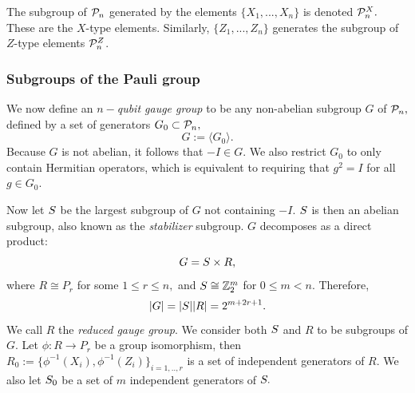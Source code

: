 The subgroup of $\mathcal{P}_n$ generated by
the elements $\{X_1,...,X_n\}$ %
is denoted $\mathcal{P}_n^X.$ These are the $X$-type
elements. Similarly,
 $\{Z_1,...,Z_n\}$ generates %
the subgroup of $Z$-type elements $\mathcal{P}_n^Z$.

\subsubsection{Subgroups of the Pauli group}

We now define an {\it $n-$qubit gauge group} to be 
any non-abelian subgroup $G$ of $\mathcal{P}_n,$
defined by a set of generators $G_0\subset \mathcal{P}_n,$
$$ G := \langle G_0\rangle.$$
Because $G$ is not abelian, it follows that $-I\in G.$
We also restrict $G_0$ to only contain Hermitian operators,
which is equivalent to requiring that $g^2=I$ for all $g\in G_0.$

Now let $S$ be the largest subgroup of $G$ not containing
$-I.$
$S$ is then an abelian subgroup,
also known as the {\it stabilizer} subgroup.
$G$ decomposes as a direct product:
$$G = S\times R,$$
where $R\cong P_r$ for some $1\le r\le n,$
and $S\cong \mathbb{Z}_2^{m}$ for $0\le m<n.$
Therefore, 
$$|G| = |S| |R| = 2^{m+2r+1}.$$
We call $R$ the {\it reduced gauge group}.
We consider both $S$ and $R$ to be subgroups of $G.$
Let $\phi:R\to P_r$ be a group isomorphism,
then $R_0 := \{\phi^{-1}(X_i), \phi^{-1}(Z_i)\}_{i=1,..,r}$
is a set of independent generators of $R.$
We also let $S_0$ be a set of $m$ independent generators of $S.$

